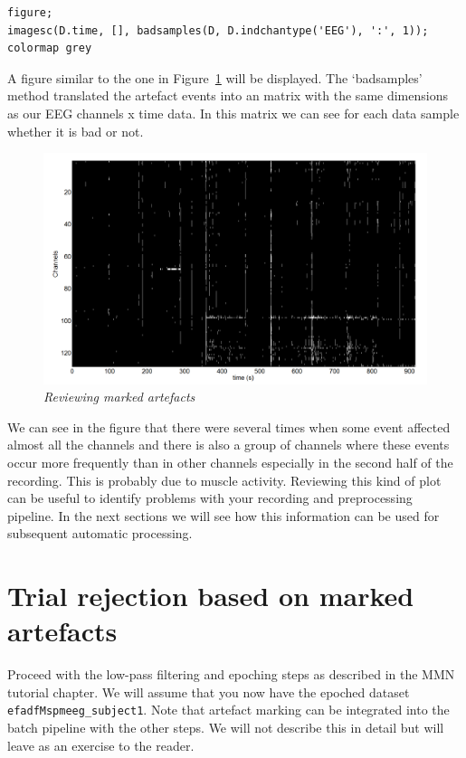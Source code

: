 \begin{verbatim}
figure; 
imagesc(D.time, [], badsamples(D, D.indchantype('EEG'), ':', 1));
colormap grey
\end{verbatim}

A figure similar to the one in Figure~\ref{artefact_fig1} will be displayed. The `badsamples' method translated the artefact events into an matrix with the same dimensions as our EEG channels x time data. In this matrix we can see for each data sample whether it is bad or not. 

\begin{figure}
\begin{center}
\includegraphics[width=140mm]{meeg_artefact/figure1}
\caption{\em Reviewing marked artefacts \label{artefact_fig1}}
\end{center}
\end{figure}

We can see in the figure that there were several times when some event affected almost all the channels and there is also a group of channels where these events occur more frequently than in other channels especially in the second half of the recording. This is probably due to muscle activity.  Reviewing this kind of plot can be useful to identify problems with your recording and preprocessing pipeline. In the next sections we will see how this information can be used for subsequent automatic processing.

\section{Trial rejection based on marked artefacts}

Proceed with the low-pass filtering and epoching steps as described in the MMN tutorial chapter. We will assume that you now have the epoched dataset \texttt{efadfMspmeeg\_subject1}. Note that artefact marking can be integrated into the batch pipeline with the other steps. We will not describe this in detail but will leave as an exercise to the reader. 

